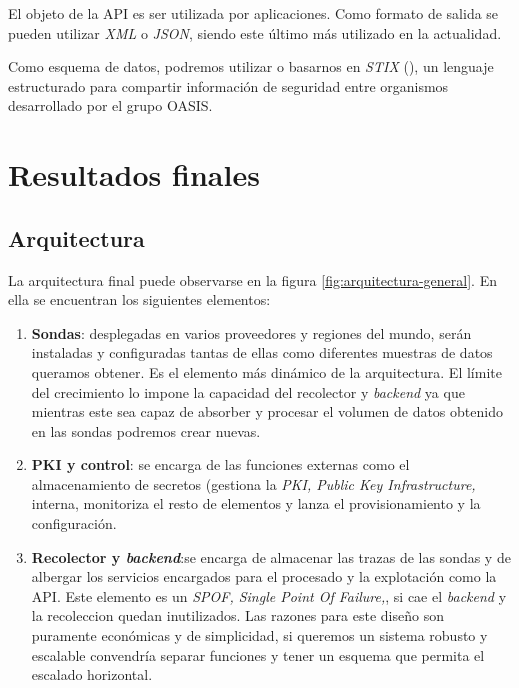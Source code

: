 El objeto de la API es ser utilizada por aplicaciones. Como formato de salida se pueden utilizar \emph{XML} o \emph{JSON}, siendo 
este último más utilizado en la actualidad.

Como esquema de datos, podremos utilizar o basarnos en \emph{STIX} (\cite{oasis-stix}), un lenguaje estructurado para compartir información de seguridad entre organismos
desarrollado por el grupo OASIS.

\chapter{Resultados finales}
\minitoc{}
\section{Arquitectura}

La arquitectura final puede observarse en la figura \ref{fig:arquitectura-general}. En ella se encuentran los siguientes elementos:

\begin{enumerate}
    \item \textbf{Sondas}: desplegadas en varios proveedores y regiones del mundo, serán instaladas y configuradas tantas de ellas como
    diferentes muestras de datos queramos obtener. Es el elemento más dinámico de la arquitectura. El límite del crecimiento lo impone la capacidad
    del recolector y \emph{backend} ya que mientras este sea capaz de absorber y procesar el volumen de datos obtenido en las sondas podremos crear nuevas.
    \item \textbf{PKI y control}: se encarga de las funciones externas como el almacenamiento de secretos (gestiona la \emph{PKI, Public Key Infrastructure,} interna, monitoriza el resto de elementos y lanza el provisionamiento y la configuración.
    \item \textbf{Recolector y \emph{backend}}:se encarga de almacenar las trazas de las sondas y de albergar los servicios encargados para el procesado y la explotación como la API. Este elemento es un \emph{SPOF, Single Point Of Failure,}, si cae el \emph{backend} y la recoleccion quedan inutilizados.
    Las razones para este diseño son puramente económicas y de simplicidad, si queremos un sistema robusto y escalable convendría separar funciones y tener un esquema que permita el escalado horizontal.
\end{enumerate}

